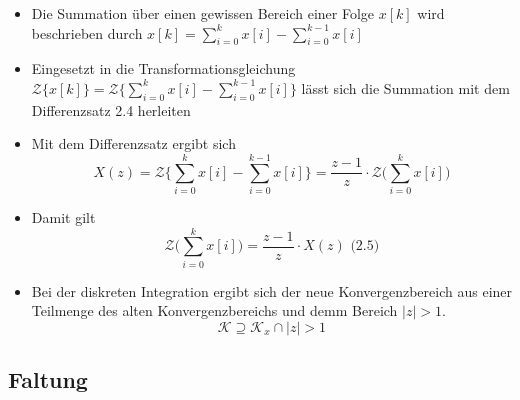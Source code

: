 \documentclass[11pt]{article}
\def\gt{>}
\begin{document}
\begin{itemize}
\item
  Die Summation über einen gewissen Bereich einer Folge \(x[k]\) wird
  beschrieben durch \(x[k] = \sum_{i=0}^k x[i] - \sum_{i=0}^{k-1} x[i]\)
\item
  Eingesetzt in die Transformationsgleichung
  \(\mathcal{Z}\{x[k]\} = \mathcal{Z} \{\sum_{i=0}^k x[i] - \sum_{i=0}^{k-1} x[i]\}\)
  lässt sich die Summation mit dem Differenzsatz 2.4 herleiten
\item
  Mit dem Differenzsatz ergibt sich
  \[X(z) = \mathcal{Z} \{\sum_{i=0}^k x[i] - \sum_{i=0}^{k-1} x[i]\} = \frac{z-1}{z} \cdot \mathcal{Z}\big( \sum_{i=0}^k x[i] \big)\]
\item
  Damit gilt
  \[\mathcal{Z}\big( \sum_{i=0}^k x[i] \big) = \frac{z-1}{z} \cdot X(z)\textrm{  (2.5)}\]
\item
  Bei der diskreten Integration ergibt sich der neue Konvergenzbereich
  aus einer Teilmenge des alten Konvergenzbereichs und demm Bereich
  \({|z| \gt 1}\).
  \[\mathcal{K} \supseteq \mathcal{K}_x \cap {|z| \gt 1}\]
\end{itemize}

    \subsection{Faltung}\label{faltung}
\end{document}
